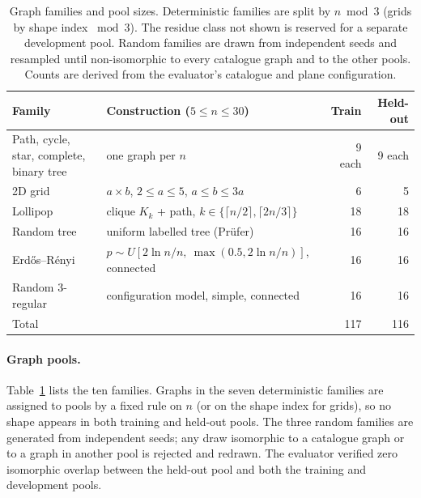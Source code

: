 \documentclass{article}
\begin{document}
\begin{table}[t]
\centering
\caption{Graph families and pool sizes. Deterministic families are split by $n \bmod 3$ (grids by shape index $\bmod 3$). The residue class not shown is reserved for a separate development pool. Random families are drawn from independent seeds and resampled until non-isomorphic to every catalogue graph and to the other pools. Counts are derived from the evaluator's catalogue and plane configuration.}
\label{tab:roster}
\small
\begin{tabular}{llrr}
\toprule
Family & Construction ($5\le n\le 30$) & Train & Held-out \\
\midrule
Path, cycle, star, complete, binary tree & one graph per $n$ & 9 each & 9 each \\
2D grid & $a\times b$, $2\le a\le 5$, $a\le b\le 3a$ & 6 & 5 \\
Lollipop & clique $K_k$ + path, $k\in\{\lceil n/2\rceil,\lceil 2n/3\rceil\}$ & 18 & 18 \\
Random tree & uniform labelled tree (Pr\"ufer) & 16 & 16 \\
Erd\H{o}s--R\'enyi & $p\sim U[2\ln n/n,\ \max(0.5, 2\ln n/n)]$, connected & 16 & 16 \\
Random 3-regular & configuration model, simple, connected & 16 & 16 \\
\midrule
Total & & 117 & 116 \\
\bottomrule
\end{tabular}
\end{table}

\paragraph{Graph pools.} Table~\ref{tab:roster} lists the ten families. Graphs in the seven deterministic families are assigned to pools by a fixed rule on $n$ (or on the shape index for grids), so no shape appears in both training and held-out pools. The three random families are generated from independent seeds; any draw isomorphic to a catalogue graph or to a graph in another pool is rejected and redrawn. The evaluator verified zero isomorphic overlap between the held-out pool and both the training and development pools. %
\end{document}
